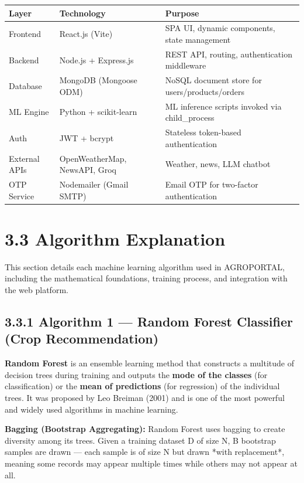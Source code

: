 \documentclass[12pt,a4paper]{report}
\begin{document}
\begin{table}[h!]
\centering
\begin{tabular}{|l|l|l|}
\hline
Layer & Technology & Purpose \\ \hline
Frontend & React.js (Vite) & SPA UI, dynamic components, state management \\ \hline
Backend & Node.js + Express.js & REST API, routing, authentication middleware \\ \hline
Database & MongoDB (Mongoose ODM) & NoSQL document store for users/products/orders \\ \hline
ML Engine & Python + scikit-learn & ML inference scripts invoked via child\_process \\ \hline
Auth & JWT + bcrypt & Stateless token-based authentication \\ \hline
External APIs & OpenWeatherMap, NewsAPI, Groq & Weather, news, LLM chatbot \\ \hline
OTP Service & Nodemailer (Gmail SMTP) & Email OTP for two-factor authentication \\ \hline
\end{tabular}
\end{table}

\newpage

\section{3.3 Algorithm Explanation}

This section details each machine learning algorithm used in AGROPORTAL, including the mathematical foundations, training process, and integration with the web platform.

\newpage

\subsection{3.3.1 Algorithm 1 — Random Forest Classifier (Crop Recommendation)}


\textbf{Random Forest} is an ensemble learning method that constructs a multitude of decision trees during training and outputs the \textbf{mode of the classes} (for classification) or the \textbf{mean of predictions} (for regression) of the individual trees. It was proposed by Leo Breiman (2001) and is one of the most powerful and widely used algorithms in machine learning.


\textbf{Bagging (Bootstrap Aggregating):} Random Forest uses bagging to create diversity among its trees. Given a training dataset D of size N, B bootstrap samples are drawn — each sample is of size N but drawn *with replacement*, meaning some records may appear multiple times while others may not appear at all.
\end{document}
